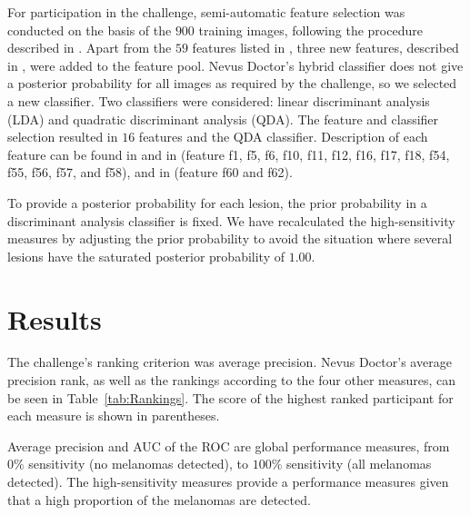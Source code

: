 \documentclass[a4paper,12pt]{article}
\begin{document}
For participation in the challenge, semi-automatic feature selection was conducted on the basis of the $900$ training images, following the procedure described in \cite{Mollersen2015Improved}. Apart from the $59$ features listed in \cite{Mollersen2015Improved}, three new features, described in \cite{Mollersen2015Divergencebased}, were added to the feature pool. Nevus Doctor's hybrid classifier does not give a posterior probability for all images as required by the challenge, so we selected a new classifier. Two classifiers were considered: linear discriminant analysis (LDA) and quadratic discriminant analysis (QDA). The feature and classifier selection resulted in $16$ features and the QDA classifier. Description of each feature can be found in \cite{Mollersen2015Improved} and in \cite{Zortea2014Performance} (feature f1, f5, f6, f10, f11, f12, f16, f17, f18, f54, f55, f56, f57, and f58), and in  \cite{Mollersen2015Divergencebased} (feature f60 and f62).

To provide a posterior probability for each lesion, the prior probability in a discriminant analysis classifier is fixed. We have recalculated the high-sensitivity measures by adjusting the prior probability to avoid the situation where several lesions have the saturated posterior probability of $1.00$. 

\section{Results} \label{sec:Results}

The challenge's ranking criterion was average precision. Nevus Doctor's average precision rank, as well as the rankings according to the four other measures, can be seen in Table~\ref{tab:Rankings}. The score of the highest ranked participant for each measure is shown in parentheses.

Average precision and AUC of the ROC are global performance measures, from $0\%$ sensitivity (no melanomas detected), to $100\%$ sensitivity (all melanomas detected). The high-sensitivity measures provide a performance measures given that a high proportion of the melanomas are detected.

\end{document}
